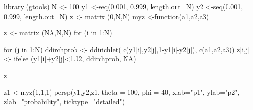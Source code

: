 \begin{Schunk}
\begin{Sinput}
 library (gtools)
 N <- 100       
 y1 <-seq(0.001, 0.999, length.out=N)
 y2 <-seq(0.001, 0.999, length.out=N)   
 z <- matrix (0,N,N) 
 myz <-function(a1,a2,a3){
     z <- matrix (NA,N,N)
     for (i in 1:N) {   
  
         for (j in 1:N) {
           ddirchprob <- ddirichlet( c(y1[i],y2[j],1-y1[i]-y2[j]), c(a1,a2,a3))
           z[i,j] <- ifelse (y1[i]+y2[j]<1.02, ddirchprob, NA)
     }
  } 
  z
  }
 z1 <-myz(1,1,1)
 persp(y1,y2,z1, theta = 100, phi = 40, xlab="p1", ylab="p2", zlab="probability", ticktype="detailed")
\end{Sinput}
\end{Schunk}
